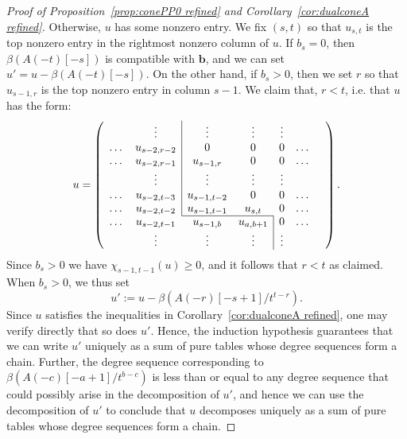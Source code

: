 \documentclass[12pt]{amsart}
\theoremstyle{definition}
\theoremstyle{remark}
\newcommand{\bb}{\mathbf{b}}
\begin{document}
\begin{proof}[Proof of Proposition~\ref{prop:conePP0 refined} and Corollary~\ref{cor:dualconeA refined}]
Otherwise, $u$ has some nonzero entry.  We fix $(s,t)$ so that $u_{s,t}$ is the top nonzero entry in the rightmost nonzero column of $u$.
If $b_s=0$, then $\beta(A(-t)[-s])$ is compatible with $\bb$, and we can set $u'=u-\beta(A(-t)[-s])$.  On the other hand, if $b_s>0$, then we set $r$ so that $u_{s-1,r}$ is the top nonzero entry in column $s-1$.  We claim that, $r<t$, i.e. that $u$ has the form:
\[
u=
\left(
\begin{array}{ccccccc}
 & \vdots& \multicolumn{1}{|c}{\vdots}&\vdots& \vdots&&\\
\dots&u_{s-2,r-2}&\multicolumn{1}{|c}{0}&0&0&\dots\\
\dots&u_{s-2,r-1}&\multicolumn{1}{|c}{u_{s-1,r}}&0&0&\dots\\
 & \vdots& \multicolumn{1}{|c}{\vdots}&\vdots& \vdots&&\\
\dots&u_{s-2,t-3}&\multicolumn{1}{|c}{u_{s-1,t-2}}&0&0&\dots\\
\dots&u_{s-2,t-2}&\multicolumn{1}{|c}{u_{s-1,t-1}}&u_{s,t}&0&\dots\\ \cline{3-4}
\dots&u_{s-2,t-1}&u_{s-1,b}&u_{a,b+1}&\multicolumn{1}{|c}{0}&\dots\\
& \vdots&\vdots&\vdots& \multicolumn{1}{|c}{\vdots}&&\\
\end{array}\right).
\]
Since $b_s>0$ we have $\chi_{s-1,t-1}(u)\geq 0$, and it follows that $r<t$ as claimed.  When $b_s>0$, we thus set
\[
u':=u-\beta(A(-r)[-s+1]/t^{t-r}).
\]
Since $u$ satisfies the inequalities in Corollary~\ref{cor:dualconeA refined}, one may verify directly that so does $u'$.  Hence, the induction hypothesis guarantees that we can write $u'$ uniquely as a sum of pure tables whose degree sequences form a chain.  Further, the degree sequence corresponding to $\beta(A(-c)[-a+1]/t^{b-c})$ is less than or equal to any degree sequence that could possibly arise in the decomposition of $u'$, and hence we can use the decomposition of $u'$ to conclude that $u$ decomposes uniquely as a sum of pure tables whose degree sequences form a chain.


\end{proof}
\end{document}
